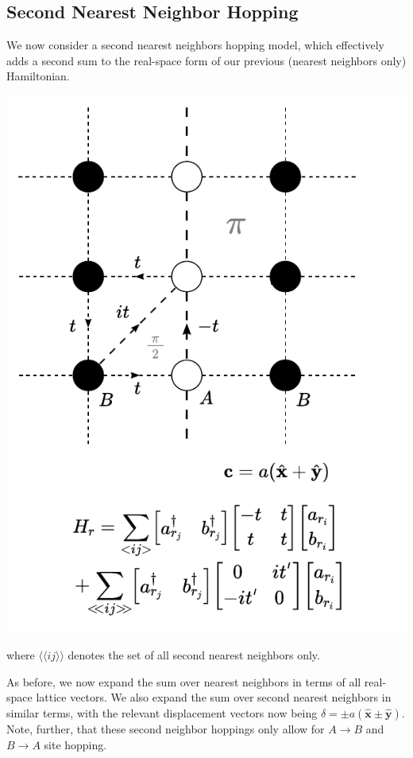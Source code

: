 \documentclass[10pt,a4paper]{article}\usepackage[]{graphicx}\usepackage[]{color}
\begin{document}
\begin{multicols}{2}
\subsection{Second Nearest Neighbor Hopping}
We now consider a second nearest neighbors hopping model, which effectively adds a second sum to the real-space form of our previous (nearest neighbors only) Hamiltonian.
\begin{center}
\includegraphics[scale=.7]{sqpi2nn.pdf}
\end{center}
where $\langle\langle ij\rangle\rangle$ denotes the set of all second nearest neighbors only.
\columnbreak

As before, we now expand the sum over nearest neighbors in terms of all real-space lattice vectors. We also expand the sum over second nearest neighbors in similar terms, with the relevant displacement vectors now being $\delta = \pm a (\hat{\mathbf{x}}\pm \hat{\mathbf{y}})$. Note, further, that these second neighbor hoppings only allow for $A\rightarrow B$ and $B\rightarrow A$ site hopping.


\end{multicols}
\end{document}
